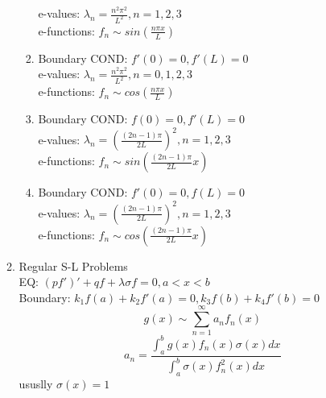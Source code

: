 \documentclass[10pt]{article}
\begin{document}
\begin{multicols}{2}
\begin{enumerate}
\begin{enumerate}
\begin{enumerate}
				e-values: $\lambda_n = \frac{n^2\pi^2}{L^2}, n = 1,2,3$\\
				e-functions: $f_n \sim sin(\frac{n \pi x}{L})$
				\item Boundary COND: $f'(0) = 0, f'(L) = 0$\\
				e-values: $\lambda_n = \frac{n^2\pi^2}{L^2}, n = 0,1,2,3$\\
				e-functions: $f_n \sim cos(\frac{n \pi x}{L})$
				\item Boundary COND: $f(0) = 0, f'(L) = 0$\\
				e-values: $\lambda_n = (\frac{(2n-1)\pi}{2L})^2, n = 1,2,3$\\
				e-functions: $f_n \sim sin(\frac{(2n-1)\pi}{2L}x)$
				\item Boundary COND: $f'(0) = 0, f(L) = 0$\\
				e-values: $\lambda_n = (\frac{(2n-1)\pi}{2L})^2, n = 1,2,3$\\
				e-functions: $f_n \sim cos(\frac{(2n-1)\pi}{2L}x)$
			\end{enumerate}
			\item Regular S-L Problems\\
				EQ: $(pf')' + qf + \lambda \sigma f = 0, a < x < b$\\
				Boundary: $k_1f(a) + k_2f'(a) = 0, k_3f(b) + k_4f'(b) = 0$\\
				$$g(x) \sim \sum_{n=1}^{\infty}a_n f_n(x) $$
				$$a_n = \frac{\int_{a}^{b}g(x)f_n(x)\sigma (x)dx}{\int_{a}^{b}\sigma(x) f_n^2(x)dx}$$
				ususlly $\sigma(x) = 1$
			
		\end{enumerate}
	

\end{enumerate}
\end{multicols}
\end{document}
